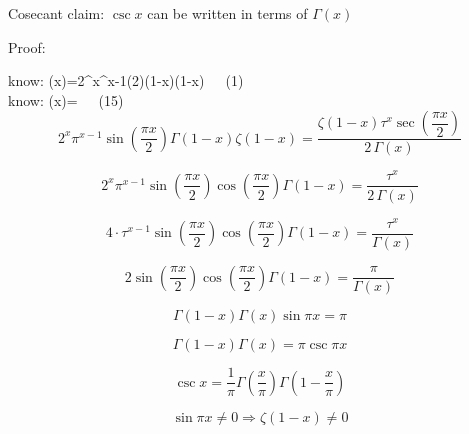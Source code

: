 \documentclass[12pt]{article}
\begin{document}
\pagebreak\begin{section}{Cosecant}
	claim: $\csc x$ can be written in terms of $\Gamma(x)$

	\noindent Proof:

	\noindent know: \zeta(x)=2^x\pi^{x-1}\sin\left(2\right)\Gamma(1-x)\zeta(1-x)~~~(1)\\
	
	\noindent know: \zeta(x)=~~~(15)\\

	\begin{equation}
		2^x\pi^{x-1}\sin\left(\dfrac{\pi x}2\right)\Gamma(1-x)\zeta(1-x)=\dfrac{\zeta(1-x)\tau^x\sec\left(\dfrac{\pi x}2\right)}{2\,\Gamma(x)}
	\end{equation}

	\begin{equation}
		2^x\pi^{x-1}\sin\left(\dfrac{\pi x}2\right)\cos\left(\dfrac{\pi x}2\right)\Gamma(1-x)=\dfrac{\tau^x}{2\,\Gamma(x)}
	\end{equation}

	\begin{equation}
		4\cdot\tau^{x-1}\sin\left(\dfrac{\pi x}2\right)\cos\left(\dfrac{\pi x}2\right)\Gamma(1-x)=\dfrac{\tau^x}{\Gamma(x)}
	\end{equation}

	\begin{equation}
		2\sin\left(\dfrac{\pi x}2\right)\cos\left(\dfrac{\pi x}2\right)\Gamma(1-x)=\dfrac{\pi}{\Gamma(x)}
	\end{equation}

	\begin{equation}
		\Gamma(1-x)\Gamma(x)\sin\pi x=\pi
	\end{equation}

	\begin{equation}
		\Gamma(1-x)\Gamma(x)=\pi\csc\pi x
	\end{equation}

	\begin{equation}
		\csc x=\dfrac1\pi\Gamma\left(\dfrac x\pi\right)\Gamma\left(1-\dfrac x\pi\right)
	\end{equation}

	\begin{equation}
		\sin\pi x\ne0\Longrightarrow\zeta(1-x)\ne0
	\end{equation}


	\noindent\blacksquare
\end{section}
\end{document}
